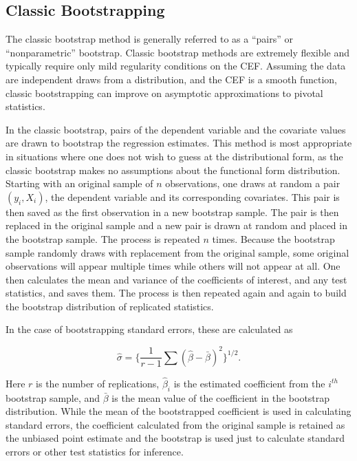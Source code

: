 \documentclass[11pt]{article}
\begin{document}

\subsection{Classic Bootstrapping}

The classic bootstrap method is generally referred to as a ``pairs'' or ``nonparametric'' bootstrap. Classic bootstrap methods are extremely flexible and typically require only mild regularity conditions on the CEF. Assuming the data are independent draws from a distribution, and the CEF is a smooth function, classic bootstrapping can improve on asymptotic approximations to pivotal statistics.

In the classic bootstrap, pairs of the dependent variable and the covariate values are drawn to bootstrap the regression estimates. This method is most appropriate in situations where one does not wish to guess at the distributional form, as the classic bootstrap makes no assumptions about the functional form distribution. Starting with an original sample of $n$ observations, one draws at random a pair $(y_i,X_i )$, the dependent variable and its corresponding covariates. This pair is then saved as the first observation in a new bootstrap sample. The pair is then replaced in the original sample and a new pair is drawn at random and placed in the bootstrap sample. The process is repeated $n$ times. Because the bootstrap sample randomly draws with replacement from the original sample, some original observations will appear multiple times while others will not appear at all. One then calculates the mean and variance of the coefficients of interest, and any test statistics, and saves them. The process is then repeated again and again to build the bootstrap distribution of replicated statistics.

In the case of bootstrapping standard errors, these are calculated as

\begin{equation}
    \hat{\sigma} = \bigg\{ \frac{1}{r-1} \sum \left( \hat{\beta} - \bar{\beta} \right) ^{2} \bigg\}^{1/2}.
\end{equation}

\noindent Here $r$ is the number of replications, $\hat{\beta}_i$ is the estimated coefficient from the $i^{th}$  bootstrap sample, and $\bar{\beta}$ is the mean value of the coefficient in the bootstrap distribution. While the mean of the bootstrapped coefficient is used in calculating standard errors, the coefficient calculated from the original sample is retained as the unbiased point estimate and the bootstrap is used just to calculate standard errors or other test statistics for inference.
\end{document}
